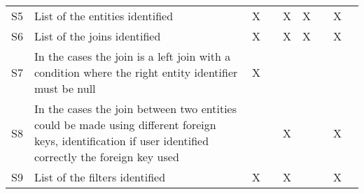 \begin{longtable}{@{}lm{7cm}ccccccc@{}}
    S5          & List of the entities identified                                                                                                                         & X                                              &                                                & X                                              & X                                              &                                                & X                                              &                                                \\
    S6          & List of the joins identified                                                                                                                            & X                                              &                                                & X                                              & X                                              &                                                & X                                              &                                                \\
    S7          & In the cases the join is a left join with a condition where the right entity identifier must be null & X                                               &                                                &                                               &                                                &                                                &                                              &                                                \\
    S8          & In the cases the join between two entities could be made using different foreign keys, identification if user identified correctly the foreign key used &                                                &                                                & X                                              &                                                &                                                & X                                              &                                                \\
    S9          & List of the filters identified                                                                                                                          & X                                              &                                                & X                                              &                                                &                                                & X                                              &                                                \\

\end{longtable}
